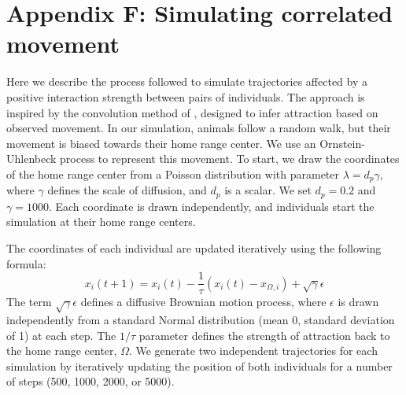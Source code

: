 \documentclass[11pt]{article}
\begin{document}
\section*{Appendix F: Simulating correlated movement}
Here we describe the process followed to simulate trajectories affected by a positive interaction strength between pairs of individuals. The approach is inspired by the convolution method of \citet{Scharf2018}, designed to infer attraction based on observed movement. In our simulation, animals follow a random walk, but their movement is biased towards their home range center.  We use an Ornstein-Uhlenbeck process to represent this movement. 
To start, we draw the coordinates of the home range center from a Poisson distribution with parameter $\lambda=d_p\gamma$, where $\gamma$ defines the scale of diffusion, and $d_p$ is a scalar. We set $d_p=0.2$ and $\gamma=1000$. Each coordinate is drawn independently, and individuals start the simulation at their home range centers. 

The coordinates of each individual are updated iteratively using the following formula:
\begin{equation}
	x_i(t+1)=x_i(t)-\frac{1}{\tau}(x_i(t)-x_{\Omega,i})+\sqrt{\gamma}\epsilon
\end{equation}
The term $\sqrt\gamma\epsilon$ defines a diffusive Brownian motion process, where $\epsilon$ is drawn independently from a standard Normal distribution (mean 0, standard deviation of 1) at each step. The $1/\tau$ parameter defines the strength of attraction back to the home range center, $\Omega$.
We generate two independent trajectories for each simulation by iteratively updating the position of both individuals for a number of steps (500, 1000, 2000, or 5000). 
\end{document}
